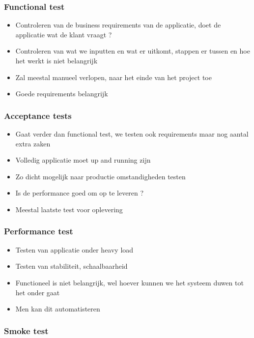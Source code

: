 \documentclass{article}
\begin{document}
\subsubsection{Functional test}

\begin{itemize}
    \item Controleren van de business requirements van de applicatie, doet de applicatie wat de klant vraagt ?
    \item Controleren van wat we inputten en wat er uitkomt, stappen er tussen en hoe het werkt is niet belangrijk
    \item Zal meestal manueel verlopen, naar het einde van het project toe
    \item Goede requirements belangrijk
\end{itemize}

\subsubsection{Acceptance tests}

\begin{itemize}
    \item Gaat verder dan functional test, we testen ook requirements maar nog aantal extra zaken
    \item Volledig applicatie moet up and running zijn
    \item Zo dicht mogelijk naar productie omstandigheden testen
    \item Is de performance goed om op te leveren ?
    \item Meestal laatste test voor oplevering
\end{itemize}

\subsubsection{Performance test}

\begin{itemize}
    \item Testen van applicatie onder heavy load
    \item Testen van stabiliteit, schaalbaarheid
    \item Functioneel is niet belangrijk, wel hoever kunnen we het systeem duwen tot het onder gaat
    \item Men kan dit automatisteren
\end{itemize}

\subsubsection{Smoke test}
\end{document}
